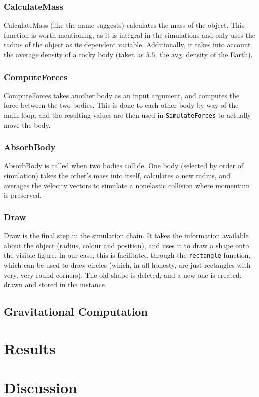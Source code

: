 \documentclass[11pt]{article}
\begin{document}
\subsubsection{CalculateMass}
CalculateMass (like the name suggests) calculates the mass of the object. This function is worth mentioning, as it is integral in the simulations and only uses the radius of the object as its dependent variable. Additionally, it takes into account the average density of a rocky body (taken as $5.5$, the avg. density of the Earth).
\subsubsection{ComputeForces}
ComputeForces takes another body as an input argument, and computes the force between the two bodies. This is done to each other body by way of the main loop, and the resulting values are then used in \verb|SimulateForces| to actually move the body.
\subsubsection{AbsorbBody}
AbsorbBody is called when two bodies collide. One body (selected by order of simulation) takes the other's mass into itself, calculates a new radius, and averages the velocity vectors to simulate a nonelastic collision where momentum is preserved.
\subsubsection{Draw}
Draw is the final step in the simulation chain. It takes the information available about the object (radius, colour and position), and uses it to draw a shape onto the visible figure. In our case, this is facilitated through the \verb|rectangle| function, which can be used to draw circles (which, in all honesty, are just rectangles with very, very round corners). The old shape is deleted, and a new one is created, drawn and stored in the instance.

\subsection{Gravitational Computation}\label{gravityComputeInfo}

\section{Results}

\section{Discussion}

\printbibliography
\end{document}
